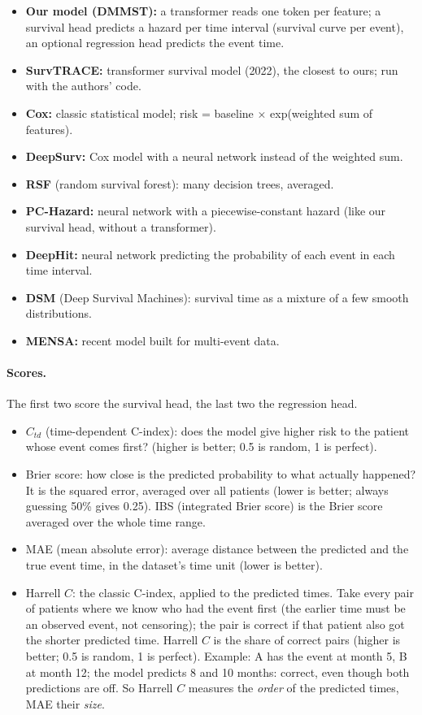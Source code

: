 \documentclass[11pt]{article}
\begin{document}
\begin{itemize}
  \item \textbf{Our model (DMMST):} a transformer reads one token per feature; a survival head predicts
        a hazard per time interval (survival curve per event), an optional regression head predicts the event time.
  \item \textbf{SurvTRACE:} transformer survival model (2022), the closest to ours; run with the authors' code.
  \item \textbf{Cox:} classic statistical model; risk = baseline $\times$ exp(weighted sum of features).
  \item \textbf{DeepSurv:} Cox model with a neural network instead of the weighted sum.
  \item \textbf{RSF} (random survival forest): many decision trees, averaged.
  \item \textbf{PC-Hazard:} neural network with a piecewise-constant hazard (like our survival head, without a transformer).
  \item \textbf{DeepHit:} neural network predicting the probability of each event in each time interval.
  \item \textbf{DSM} (Deep Survival Machines): survival time as a mixture of a few smooth distributions.
  \item \textbf{MENSA:} recent model built for multi-event data.
\end{itemize}

\paragraph{Scores.}
The first two score the survival head, the last two the regression head.
\begin{itemize}
  \item $C_{td}$ (time-dependent C-index): does the model give higher risk to the patient whose event
        comes first? (higher is better; 0.5 is random, 1 is perfect).
  \item Brier score: how close is the predicted probability to what actually happened? It is the
        squared error, averaged over all patients (lower is better; always guessing 50\% gives 0.25).
        IBS (integrated Brier score) is the Brier score averaged over the whole time range.
  \item MAE (mean absolute error): average distance between the predicted and the true event time,
        in the dataset's time unit (lower is better).
  \item Harrell $C$: the classic C-index, applied to the predicted times. Take every pair of patients
        where we know who had the event first (the earlier time must be an observed event, not
        censoring); the pair is correct if that patient also got the shorter predicted time.
        Harrell $C$ is the share of correct pairs (higher is better; 0.5 is random, 1 is perfect).
        Example: A has the event at month 5, B at month 12; the model predicts 8 and 10 months:
        correct, even though both predictions are off. So Harrell $C$ measures the \emph{order} of the
        predicted times, MAE their \emph{size}.
\end{itemize}
\end{document}
